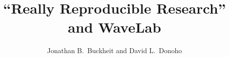


\setcounter{page}{1} %

\title{``Really Reproducible Research'' and WaveLab}

\author{Jonathan B.\ Buckheit and David L.\ Donoho}


\maketitle


\newcommand{\dotm}{{\tt .m}\ } 
\newcommand{\dotmex}{{\tt .mex}\ }
\newcommand{\dotdat}{{\tt .dat}\ }
\newcommand{\dotraw}{{\tt .raw}\ } 
\newcommand{\dotasc}{{\tt .asc}\ }
\newcommand{\dotdoc}{{\tt .doc}\ }
\newcommand{\dotps} {{\tt .ps}\ }
\newcommand{\dottex}{{\tt .tex}\ }
\newcommand{\dotzip}{{\tt .zip}\ }
\newcommand{\dottar}{{\tt .tar.Z}\ }
\newcommand{\dotsea}{{\tt .sea.hqx}\ }
\newcommand{\BS}{$\backslash$}

\newcommand{\Contents}{ {\tt Contents.m}\ }
\newcommand{\WavePath}{ {\tt WavePath.m}\ }
\newcommand{\Startup}{  {\tt startup.m}\ }
\newcommand{\WLDir}{    {\tt WaveLab/}\ }
\newcommand{\WLDirNS}{  {\tt WaveLab/}}
\newcommand{\Thanks}{   {\tt THANKS.m}\ }
\newcommand{\Copying}{  {\tt COPYING.m}\ }
\newcommand{\Warranty}{ {\tt WARRANTY.m}\ }
\newcommand{\Payment}{  {\tt PAYMENT.m}\ }

\newcommand{\DocDir}{   {\tt WaveLab/Documentation}\ }
\newcommand{\DataDir}{  {\tt WaveLab/Datasets}\ }
\newcommand{\ScriptDir}{{\tt WaveLab/Papers}\ }
\newcommand{\WLVersion}{0.600}
\newcommand{\WLVersionNS}{0600}

\newcommand{\Playfair}   {{\tt playfair.stanford.edu}\ }
\newcommand{\PlayfairNS} {{\tt playfair.stanford.edu}}
\newcommand{\eWaveLab}   {{\tt wavelab@playfair.stanford.edu}\ }
\newcommand{\eWaveLabNS} {{\tt wavelab@playfair.stanford.edu}}

\newcommand{\WaveLab}{{\sc WaveLab}\ }   %
\newcommand{\WaveLabNS}{{\sc WaveLab}}   %
\newcommand{\TTWL}{{\tt /WaveLab}}									%
\newcommand{\Matlab}{{\sc Matlab}\ }     %
\newcommand{\MatlabNS}{{\sc Matlab}}     %

